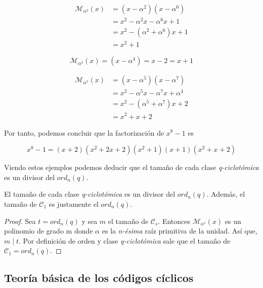 \begin{exampleth}
 \begin{equation*}
 \begin{split}
 \mathcal{M}_{\alpha^2}(x) & = (x-\alpha^2)(x-\alpha^6)  \\
 	& = x^2 -\alpha^2 x - \alpha^6 x + 1 \\
 	& = x^2 - (\alpha^2 + \alpha^6)x + 1 \\
 	& = x^2 + 1
 \end{split}
 \end{equation*}
 
 \begin{equation*}
 \mathcal{M}_{\alpha^4}(x)  = (x-\alpha^4) = x - 2 = x + 1
 \end{equation*}
 
 \begin{equation*}
 \begin{split}
 \mathcal{M}_{\alpha^5}(x) & = (x-\alpha^5)(x-\alpha^7)  \\
 	& = x^2 -\alpha^5 x - \alpha^7 x + \alpha^4 \\
 	& = x^2 - (\alpha^5 + \alpha^7)x + 2 \\
 	& = x^2 + x + 2
 \end{split}
 \end{equation*}
 
 Por tanto, podemos concluir que la factorización de $x^8-1$ es 


\[ 
x^8-1=(x+2)(x^2+2x+2)(x^2+1)(x+1)(x^2+x+2)
\] 
 
\end{exampleth}
 
Viendo estos ejemplos podemos deducir que el tamaño de cada clase \textit{q-ciclotómica} es un divisor del $ord_n(q)$.

\begin{theorem}
\label{th:tamaño_ciclotomicos}
El tamaño de cada clase \textit{q-ciclotómica} es un divisor del $ord_n(q)$. Además, el tamaño de $\mathcal{C}_1$ es justamente el  $ord_n(q)$.
\end{theorem}

\begin{proof}
Sea $t = ord_n(q)$ y sea $m$ el tamaño de $\mathcal{C}_s$. Entonces $\mathcal{M}_{\alpha^s}(x)$ es un polinomio de grado m donde $\alpha$ es la \textit{n-ésima} raíz primitiva de la unidad. Así que, $ m \mid t$. Por definición de orden y clase \textit{q-ciclotómica} sale que el tamaño de $\mathcal{C}_1 = ord_n(q) $.
\end{proof}


\subsection{Teoría básica de los códigos cíclicos}

